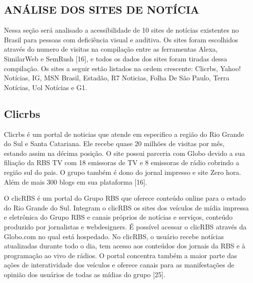 \documentclass[a4paper]{article}
\begin{document}
\begin{titlepage}
\section{ANÁLISE DOS SITES DE NOTÍCIA}

Nessa seção será analisado a acessibilidade de 10 sites de notícias existentes no Brasil para pessoas com deficiência visual e auditiva. Os sites foram escolhidos através do numero de visitas na compilação entre as ferramentas Alexa, SimilarWeb e SemRush [16], e todos os dados dos sites foram tiradas dessa compilação. Os sites a seguir estão listados na ordem crescente: Clicrbs, Yahoo! Notícias, IG, MSN Brasil, Estadão, R7 Noticias, Folha De São Paulo, Terra Notícias, Uol Notícias e G1.

\subsection{Clicrbs}

Clicrbs é um portal de noticias que atende em especifico a região do Rio Grande do Sul e Santa Catariana. Ele recebe quase 20 milhões de visitas por mês, estando assim na décima posição. O site possui parceria com Globo devido a sua filiação da RBS TV com 18 emissoras de TV e 8 emissoras de rádio cobrindo a região sul do pais. O grupo também é dono do jornal impresso e site Zero hora. Além de mais 300 blogs em sua plataforma [16].

O clicRBS é um portal do Grupo RBS que oferece conteúdo online para o estado do Rio Grande do Sul. Integram o clicRBS os sites dos veículos de mídia impressa e eletrônica do Grupo RBS e canais próprios de notícias e serviços, conteúdo produzido por jornalistas e webdesigners. É possível acessar o clicRBS através da Globo.com no qual está hospedado. No clicRBS, o usuário recebe notícias atualizadas durante todo o dia, tem acesso aos conteúdos dos jornais da RBS e à programação ao vivo de rádios. O portal concentra também a maior parte das ações de interatividade dos veículos e oferece canais para as manifestações de opinião dos usuários de todas as mídias do grupo [25].


\end{titlepage}
\end{document}
